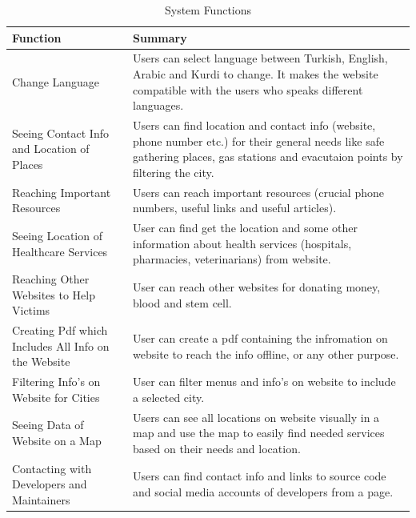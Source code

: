 \begin{center}
    \begin{table}[H]
        \begin{tabular}{| m{4cm}| m{10cm} |}
            \hline
            \textbf{Function} & \textbf{Summary} \\
            \hline
            Change Language & Users can select language between Turkish, English, Arabic and Kurdi to change. It makes the website compatible with the users who speaks different languages.\\
            \hline
            Seeing Contact Info and Location of Places & Users can find location and contact info (website, phone number etc.) for their general needs like safe gathering places, gas stations and evacutaion points by filtering the city.\\
            \hline
            Reaching Important Resources & Users can reach important resources (crucial phone numbers, useful links and useful articles).\\
            \hline
            Seeing Location of Healthcare Services & User can find get the location and some other information about health services (hospitals, pharmacies, veterinarians) from website.\\
            \hline
            Reaching Other Websites to Help Victims & User can reach other websites for donating money, blood and stem cell.\\
            \hline
            Creating Pdf which Includes All Info on the Website & User can create a pdf containing the infromation on website to reach the info offline, or any other purpose.\\
            \hline
            Filtering Info's on Website for Cities & User can filter menus and info's on website to include a selected city.\\
            \hline
            Seeing Data of Website on a Map & Users can see all locations on website visually in a map and use the map to easily find needed services based on their needs and location.\\
            \hline
            Contacting with Developers and Maintainers & Users can find contact info and links to source code and social media accounts of developers from a page.\\
            \hline
        \end{tabular}
        \caption[System Functions]{System Functions}
    \end{table}
\end{center}

